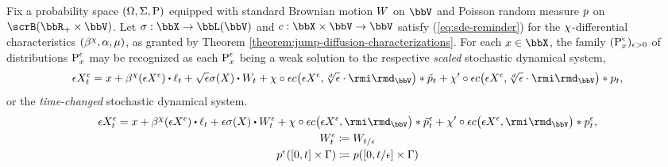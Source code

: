 \begin{proposition}
  \label{proposition:sde-asymptotics}
  Fix a probability space $(\Omega, \Sigma, {\operatorname{P}})$ equipped with standard Brownian motion $W$ on $\vecSpace$ and Poisson random measure $p$ on $\scrB(\bbR_+\times\vecSpace)$.
  Let $\affDiffSqrt: \stateSpace \rightarrow \bbL(\vecSpace)$ and $\thinner: \stateSpace \times \vecSpace \rightarrow \vecSpace$ satisfy (\ref{eq:sde-reminder}) for the $\chi$-differential characteristics $(\beta^\chi, \alpha, \mu)$, as granted by Theorem \ref{theorem:jump-diffusion-characterizations}.
  For each $\stateVar \in \stateSpace$, the family $({\operatorname{P}}^\epsilon_x)_{\epsilon>0}$ of distributions ${\operatorname{P}}^\epsilon_x$ may be recognized as each ${\operatorname{P}}^\epsilon_x$ being a weak solution to the respective \emph{scaled} stochastic dynamical system,
  \begin{equation*}
    \Xe_t = \stateVar + \affDrift^\trunc(\Xe) \shortInt \leb_t + \sqrt\epsilon \affDiffSqrt(\X) \shortInt \W_t + \trunc \circ \epsilon\thinner\big(\Xe, \sqrt[d]{\epsilon} \cdot \id_\vecSpace\big) \ast \compensate{\poisRM}_t + \trunc' \circ \epsilon\thinner\big(\Xe, \sqrt[d]{\epsilon} \cdot \id_\vecSpace\big) \ast \poisRM_t,
  \end{equation*}
  or the \emph{time-changed} stochastic dynamical system.
  \begin{gather*}
    \Xe_t = \stateVar + \affDrift^\trunc(\Xe) \shortInt \leb_t + \epsilon \affDiffSqrt(\X) \shortInt \W^\epsilon_t + \trunc \circ \epsilon\thinner\big(\Xe, \id_\vecSpace\big) \ast \compensate{\poisRM^\epsilon}_t + \trunc' \circ \epsilon\thinner\big(\Xe, \id_\vecSpace\big) \ast \poisRM^\epsilon_t, \\
    \W^\epsilon_t \defeq \W_{t/\epsilon} \\
    \poisRM^\epsilon([0,t]\times \Gamma) \defeq \poisRM([0,t/\epsilon] \times \Gamma)
  \end{gather*}
\end{proposition}
